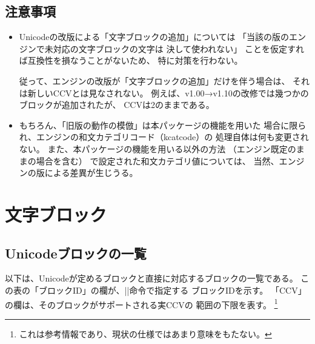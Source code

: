 \documentclass[uplatex,dvipdfmx,a4paper]{jsarticle}
\begin{document}
\subsection{注意事項}

\begin{itemize}
\item Unicodeの改版による「文字ブロックの追加」については
  「当該の版のエンジンで未対応の文字ブロックの文字は
  決して使われない」
  ことを仮定すれば互換性を損なうことがないため、
  特に対策を行わない。

  従って、エンジンの改版が「文字ブロックの追加」だけを伴う場合は、
  それは新しいCCVとは見なされない。
  例えば、v1.00→v1.10の改修では幾つかのブロックが追加されたが、
  CCVは2のままである。

\item もちろん、「旧版の動作の模倣」は本パッケージの機能を用いた
  場合に限られ、{\upTeX}エンジンの和文カテゴリコード（kcatcode）の
  処理自体は何も変更されない。
  また、本パッケージの機能を用いる以外の方法
  （エンジン既定のままの場合を含む）
  で設定された和文カテゴリ値については、
  当然、エンジンの版による差異が生じうる。

\end{itemize}


\section{文字ブロック}
\label{sec:Blocks}

\subsection{Unicodeブロックの一覧}

以下は、Unicodeが定めるブロックと直接に対応するブロックの一覧である。
この表の「ブロックID」の欄が、|\cjkcategory|命令で指定する
ブロックIDを示す。
「CCV」の欄は、そのブロックがサポートされる実CCVの
範囲の下限を表す。
\footnote{これは参考情報であり、現状の仕様ではあまり意味をもたない。}
\end{document}
